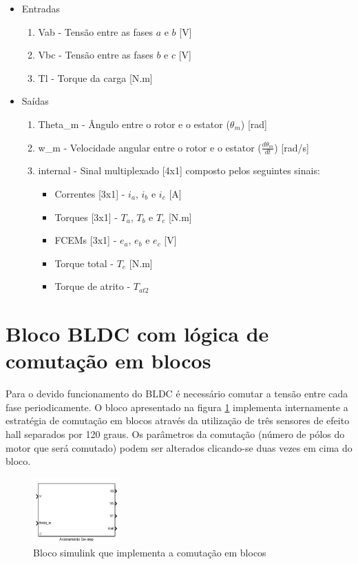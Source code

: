         \begin{itemize}
            \item Entradas
            \begin{enumerate}
                \item Vab - Tensão entre as fases $a$ e $b$ [V]
                \item Vbc - Tensão entre as fases $b$ e $c$ [V]
                \item Tl - Torque da carga [N.m]
            \end{enumerate}
            \item Saídas
            \begin{enumerate}
                \item Theta\_m - Ângulo entre o rotor e o estator ($\theta_m$) [rad]
                \item w\_m - Velocidade angular entre o rotor e o estator ($\frac{d\theta_m}{dt}$) [rad/s]
                \item internal - Sinal multiplexado [4x1] composto pelos seguintes sinais:
                \begin{itemize}
                    \item Correntes [3x1] - $i_a$, $i_b$ e $i_c$ [A]
                    \item Torques [3x1] - $T_a$, $T_b$ e $T_c$ [N.m]
                    \item FCEMs [3x1] - $e_a$, $e_b$ e $e_c$ [V]
                    \item Torque total - $T_e$ [N.m]
                    \item Torque de atrito - $T_{at2}$
                \end{itemize}
            \end{enumerate}
        \end{itemize}

    \section{Bloco BLDC com lógica de comutação em blocos}
        Para o devido funcionamento do BLDC é necessário comutar a tensão entre cada fase periodicamente. O bloco apresentado na figura \ref{fig:bloco_BLDC_block_commutation} implementa internamente a estratégia de comutação em blocos através da utilização de três sensores de efeito hall separados por 120 graus. Os parâmetros da comutação (número de pólos do motor que será comutado) podem ser alterados clicando-se duas vezes em cima do bloco.
        \begin{figure}[ht]
            \centering
            \includegraphics[width=0.3\textwidth]{bloco_acionamento_six_step}
            \caption{Bloco simulink que implementa a comutação em blocos}
            \label{fig:bloco_BLDC_block_commutation}
        \end{figure}

